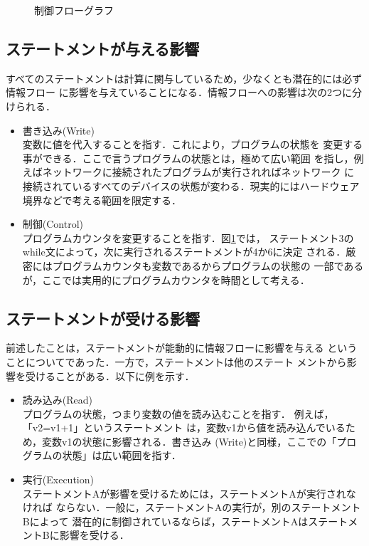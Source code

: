 \documentclass{jreport}
\begin{document}
\begin{figure}
  \centering
  \caption{制御フローグラフ}
  \label{fig:controlFlow}
\end{figure}

\subsection{ステートメントが与える影響}
すべてのステートメントは計算に関与しているため，少なくとも潜在的には必ず情報フロー
に影響を与えていることになる．情報フローへの影響は次の2つに分けられる．

\begin{itemize}
  \item 書き込み(Write)\\
  変数に値を代入することを指す．これにより，プログラムの状態を
  変更する事ができる．ここで言うプログラムの状態とは，極めて広い範囲
  を指し，例えばネットワークに接続されたプログラムが実行されればネットワーク
  に接続されているすべてのデバイスの状態が変わる．現実的にはハードウェア
  境界などで考える範囲を限定する．
  \item 制御(Control)\\
  プログラムカウンタを変更することを指す．図\ref{fig:controlFlow}では，
  ステートメント3のwhile文によって，次に実行されるステートメントが4か6に決定
  される．厳密にはプログラムカウンタも変数であるからプログラムの状態の
  一部であるが，ここでは実用的にプログラムカウンタを時間として考える．
\end{itemize}

\subsection{ステートメントが受ける影響}
前述したことは，ステートメントが能動的に情報フローに影響を与える
ということについてであった．一方で，ステートメントは他のステート
メントから影響を受けることがある．以下に例を示す．

\begin{itemize}
  \item 読み込み(Read)\\
  プログラムの状態，つまり変数の値を読み込むことを指す．
  例えば，「v2=v1+1」というステートメント
  は，変数v1から値を読み込んでいるため，変数v1の状態に影響される．書き込み
  (Write)と同様，ここでの「プログラムの状態」は広い範囲を指す．
  \item 実行(Execution)\\
  ステートメントAが影響を受けるためには，ステートメントAが実行されなければ
  ならない．一般に，ステートメントAの実行が，別のステートメントBによって
  潜在的に制御されているならば，ステートメントAはステートメントBに影響を受ける．
\end{itemize}
\end{document}
